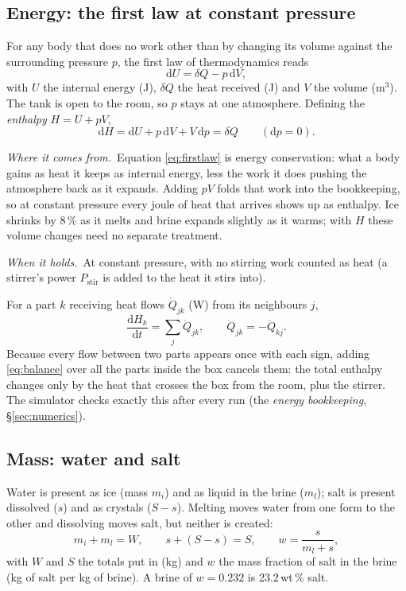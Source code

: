 \documentclass[11pt,a4paper]{article}
\newcommand{\where}{\par\noindent\textit{Where it comes from.}\ }
\newcommand{\holds}{\par\noindent\textit{When it holds.}\ }
\begin{document}
\subsection{Energy: the first law at constant pressure}
For any body that does no work other than by changing its volume against the surrounding pressure
$p$, the first law of thermodynamics reads
\begin{equation}
\mathrm dU = \delta Q - p\,\mathrm dV ,
\label{eq:firstlaw}
\end{equation}
with $U$ the internal energy (J), $\delta Q$ the heat received (J) and $V$ the volume (m$^3$). The tank
is open to the room, so $p$ stays at one atmosphere. Defining the \emph{enthalpy} $H = U + pV$,
\begin{equation}
\mathrm dH = \mathrm dU + p\,\mathrm dV + V\,\mathrm dp = \delta Q \qquad (\mathrm dp = 0).
\label{eq:dH}
\end{equation}
\where Equation \eqref{eq:firstlaw} is energy conservation: what a body gains as heat it keeps as
internal energy, less the work it does pushing the atmosphere back as it expands. Adding $pV$ folds
that work into the bookkeeping, so at constant pressure every joule of heat that arrives shows up as
enthalpy. Ice shrinks by 8\,\% as it melts and brine expands slightly as it warms; with $H$ these volume
changes need no separate treatment.
\holds At constant pressure, with no stirring work counted as heat (a stirrer's power $P_{\text{stir}}$
is added to the heat it stirs into).

For a part $k$ receiving heat flows $\dot Q_{jk}$ (W) from its neighbours $j$,
\begin{equation}
\frac{\mathrm dH_k}{\mathrm dt} = \sum_j \dot Q_{jk},
\qquad \dot Q_{jk} = -\dot Q_{kj}.
\label{eq:balance}
\end{equation}
Because every flow between two parts appears once with each sign, adding \eqref{eq:balance} over all
the parts inside the box cancels them: the total enthalpy changes only by the heat that crosses the
box from the room, plus the stirrer. The simulator checks exactly this after every run (the
\emph{energy bookkeeping}, §\ref{sec:numerics}).

\subsection{Mass: water and salt}
Water is present as ice (mass $m_i$) and as liquid in the brine ($m_l$); salt is present dissolved
($s$) and as crystals ($S - s$). Melting moves water from one form to the other and dissolving moves
salt, but neither is created:
\begin{equation}
m_i + m_l = W, \qquad s + (S - s) = S, \qquad w = \frac{s}{m_l + s},
\label{eq:mass}
\end{equation}
with $W$ and $S$ the totals put in (kg) and $w$ the mass fraction of salt in the brine (kg of salt per
kg of brine). A brine of $w = 0.232$ is 23.2\,wt\,\% salt.
\end{document}
